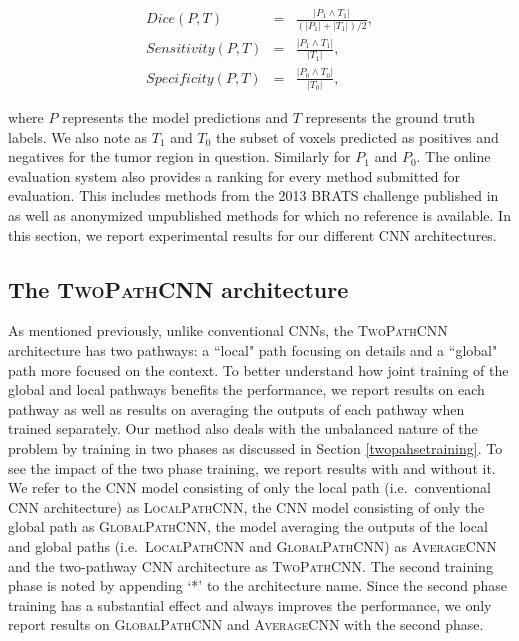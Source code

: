 \documentclass[final,5p,times,twocolumn]{elsarticle}
\begin{document}
%

\begin{eqnarray}
Dice(P,T) &=& \frac{|P_1 \wedge T_1|}{(|P_1|+|T_1|)/2}, \nonumber \\
Sensitivity(P,T) &=& \frac{|P_1 \wedge T_1|}{|T_1|}, \nonumber \\
Specificity(P,T) &=& \frac{|P_0 \wedge T_0|}{|T_0|}, \nonumber
\end{eqnarray}

%

where $P$ represents the model predictions and $T$ represents the ground truth labels. We also note as $T_1$ and $T_0$ the subset of voxels predicted as positives and negatives for the tumor region in question. Similarly for $P_1$ and $P_0$.  The online evaluation system also provides a ranking for every method submitted for evaluation. This includes methods from the 2013 BRATS challenge published in \citep{Menze2014} as well as anonymized unpublished methods for which no reference is available. In this section, we report experimental results for our different CNN architectures. 



\subsection{The \textsc{TwoPathCNN} architecture}



As mentioned previously, unlike conventional CNNs, the \textsc{TwoPathCNN} architecture has two pathways: a ``local" path focusing on details and a ``global" path more focused on the context. To better understand how joint training of the global and local pathways benefits the performance, we report results on each pathway as well as results on averaging the outputs of each pathway when trained separately. Our method also deals with the unbalanced nature of the problem by training in two phases as discussed in Section \ref{twopahsetraining}. To see the impact of the two phase training, we report results with and without it. We refer to the CNN model consisting of only the local path (i.e.\ conventional CNN architecture) as \textsc{LocalPathCNN}, the CNN model consisting of only the global path as \textsc{GlobalPathCNN}, the model averaging the outputs of the local and global paths (i.e.\ \textsc{LocalPathCNN} and \textsc{GlobalPathCNN}) as \textsc{AverageCNN} and the two-pathway CNN architecture as \textsc{TwoPathCNN}. The second training phase is noted by appending `*' to the architecture name. Since the second phase training has a substantial effect and always improves the performance, we only report results on  \textsc{GlobalPathCNN} and \textsc{AverageCNN} with the second phase.  %
\end{document}
